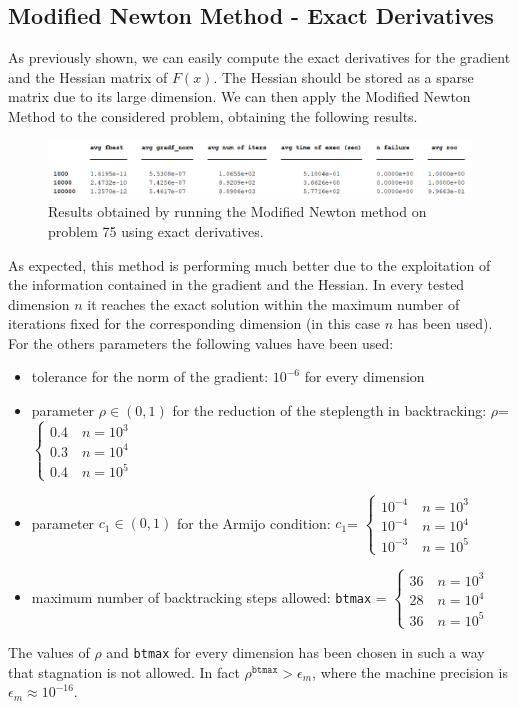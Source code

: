\subsection*{Modified Newton Method - Exact Derivatives}
As previously shown, we can easily compute the exact derivatives for the gradient and the Hessian matrix of $F(x)$. The Hessian should be stored
as a sparse matrix due to its large dimension. We can then apply the Modified Newton Method to the considered problem, obtaining the following 
results. 
\begin{figure}[H]
    \centering
    \includegraphics[width=1\textwidth]{img/pb75_table_MN.png}
    \caption{Results obtained by running the Modified Newton method on problem 75 using exact derivatives.} 
    \label{pb 75 table MN}
\end{figure}
As expected, this method is performing much better due to the exploitation of the information contained in the gradient and the Hessian. 
In every tested dimension $n$ it reaches the exact solution within the maximum number of iterations fixed for the corresponding dimension
(in this case $n$ has been used). For the others parameters the following values have been used:
\begin{itemize}
    \item tolerance for the norm of the gradient: $10^{-6}$ for every dimension
    \item parameter $\rho \in (0,1)$ for the reduction of the steplength in backtracking: $\rho$= 
    $\begin{cases}
        0.4 \quad n=10^3 \\
        0.3 \quad n=10^4 \\
        0.4 \quad n=10^5
    \end{cases}$
    \item parameter $c_1 \in (0,1)$ for the Armijo condition: $c_1$= 
    $\begin{cases}
        10^{-4} \quad n=10^3 \\
        10^{-4} \quad n=10^4 \\
        10^{-3} \quad n=10^5
    \end{cases}$
    \item maximum number of backtracking steps allowed: \texttt{btmax} = 
    $\begin{cases}
        36 \quad n=10^3 \\
        28 \quad n=10^4 \\
        36 \quad n=10^5
    \end{cases}$ 
\end{itemize}
The values of $\rho$ and \texttt{btmax} for every dimension has been chosen in such a way that stagnation is not allowed. 
In fact $\rho^{\texttt{btmax}}>\epsilon_m$, where the machine precision is $\epsilon_m \approx 10^{-16}$.

